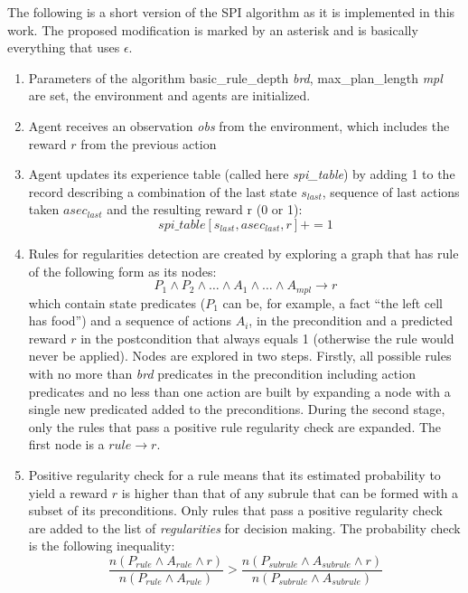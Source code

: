 \documentclass[a4paper,twocolumn]{article}
\begin{document}
The following is a short version of the SPI algorithm
as it is implemented in this work. The proposed modification is marked by an asterisk and is basically everything
that uses $\epsilon$.
\begin{enumerate}[label=\arabic*)]
	\item{Parameters of the algorithm basic\_rule\_depth {\slshape brd}, max\_plan\_length {\slshape mpl} are set, the environment and
agents are initialized.}

	\item{Agent receives an observation {\slshape obs} from the environment, which includes the reward $r$ from the previous action}
	
	\item{Agent updates its experience table (called here {\slshape spi\_table}) by adding 1 to the record describing a combination of the last state $s_{last}$, sequence of last actions taken $asec_{last}$ and the resulting reward r (0 or 1): 
$$spi\_table[s_{last},asec_{last},r]+=1$$}
	
	\item{Rules for regularities detection are created by exploring a graph that has rule of the following form as its nodes: 
$$P_1 \wedge P_2 \wedge \ldots \wedge A_1 \wedge \ldots \wedge A_{mpl} \rightarrow r$$
which contain state predicates ($P_1$ can be, for example, a fact ``the left cell has food'') and a sequence of actions $A_i$, in the precondition and a predicted reward $r$ in the postcondition that always equals 1 (otherwise the rule would never be applied). Nodes are explored in two steps. Firstly, all possible rules with no more than {\slshape brd} predicates in the precondition including action predicates and no less than one action are built by expanding a node with a single new predicated added to the preconditions. During the second stage, only the rules that pass a positive rule regularity check are expanded. The first node is a $rule \rightarrow r$.}

	\item{Positive regularity check for a rule means that its estimated probability to yield a reward $r$ is higher than that of any subrule that can be formed with a subset of its preconditions. Only rules that pass a positive regularity check are added to the list of {\slshape regularities} for decision making. The probability check is the following inequality:
$$\frac{n(P_{rule} \wedge A_{rule} \wedge r)}{n(P_{rule} \wedge A_{rule})}>\frac{n(P_{subrule} \wedge A_{subrule} \wedge r)}{n(P_{subrule} \wedge A_{subrule})}$$

}
\end{enumerate}
\end{document}
